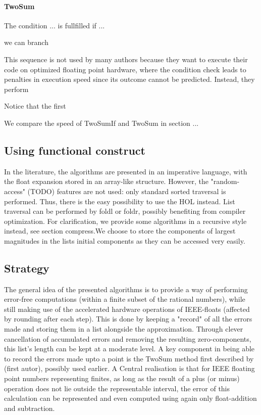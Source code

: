 \documentclass[11pt,a4paper]{article}
\begin{document}
\paragraph{TwoSum}

The condition ... is fullfilled if ...

we can branch 

This sequence is not used by many authors because they want to execute their code on optimized floating point hardware, where the condition check leads to penalties in execution speed since its outcome cannot be predicted. Instead, they perform

Notice that the first 

We compare the speed of TwoSumIf and TwoSum in section ...

\subsection{Using functional construct}
In the literature, the algorithms are presented in an imperative language, with the float expansion stored in an array-like structure. However, the "random-access" (TODO) features are not used: only standard sorted traversal is performed. Thus, there is the easy possibility to use the HOL
instead. List traversal can be performed by foldl or foldr, possibly benefiting from compiler optimization. For clarification, we provide some algorithms in a recursive style instead, see section compress.We choose to store the components of largest magnitudes in the lists initial components as they can be accessed very easily.

\subsection{Strategy}

The general idea of the presented algorithms is to provide a way of performing error-free computations (within a finite subset of the rational numbers), while still making use of the accelerated hardware operations of IEEE-floats (affected by rounding after each step). This is done by keeping a "record" of all the errors made and storing them in a list alongside the approximation. Through clever cancellation of accumulated errors and removing the resulting zero-components, this list's length can be kept at a moderate level.
A key component in being able to record the errors made upto a point is the TwoSum method first described by (first autor), possibly used earlier. A Central realisation is that for IEEE floating point numbers representing finites, as long as the result of a plus (or minus) operation does not lie outside the representable interval, the error of this calculation can be represented and even computed using again only float-addition and subtraction.
\end{document}
